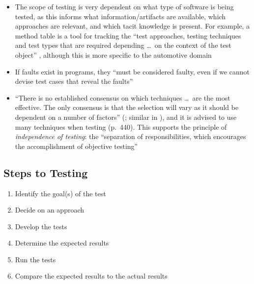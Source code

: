 \begin{itemize}
    \item The scope of testing is very dependent on what type of software
          is being tested, as this informs what information/artifacts are
          available, which approaches are relevant, and which tacit knowledge
          is present. For example, a method table
          is a tool for tracking the ``test approaches, testing techniques
          and test types that are required depending \dots\ on the context of
          the test object'' \citepISTQB{} , although
          this is more specific to the automotive domain
    \item If faults exist in programs, they ``must be considered faulty, even
          if we cannot devise test cases that reveal the faults''
          \citep[p.~401]{vanVliet2000}
    \item ``There is no established consensus on which techniques \dots\ are
          the most effective. The only consensus is that the selection will
          vary as it should be dependent on a number of factors''
          (\citealp[p.~128]{IEEE2021}; similar in
          \citealp[p.~440]{vanVliet2000}), and it is advised to
          use many techniques when testing (p.~440).
          This supports the principle of \emph{independence of testing}: the
          ``separation of responsibilities, which encourages the
          accomplishment of objective testing'' \citepISTQB{}
\end{itemize}

\subsection[Steps to Testing]{Steps to Testing
    \citep[p.~443]{PetersAndPedrycz2000}}
\begin{enumerate}
    \item Identify the goal(s) of the test
    \item Decide on an approach
    \item Develop the tests
    \item Determine the expected results
    \item Run the tests
    \item Compare the expected results to the actual results
\end{enumerate}

